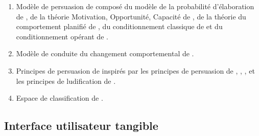 \documentclass[10pt,a5paper,twoside]{article}
\begin{document}
\begin{enumerate}
\begin{itemize}
    \citet{valkanova2013reveal} -.
  \end{itemize}
\item
  Modèle de persuasion de \citet{kaptein2010persuasion} composé du
  modèle de la probabilité d'élaboration de
  \citet{petty1986elaboration}, de la théorie Motivation, Opportunité,
  Capacité de \citet{maclnnis1989information}, de la théorie du
  comportement planifié de \citet{dillon1996user}, du conditionnement
  classique de \citet{patterson1987rabbit} et du conditionnement opérant
  de \citet{skinner1976behaviorism}.
\item
  Modèle de conduite du changement comportemental de
  \citet{prochaska2005transtheoretical}.
\item
  Principes de persuasion de \citet{negri2015ludo} inspirés par les
  principes de persuasion de \citet{fogg2002persuasive},
  \citet{oinas2009persuasive}, \citet{nemery2012development},
  \citet{cialdini2004influence} et les principes de ludification de
  \citet{zichermann2011gamification}.
\item
  Espace de classification de \citet{cano2015persuasive}.
\end{enumerate}

\subsection{Interface utilisateur
tangible}\label{interface-utilisateur-tangible}
\end{document}
